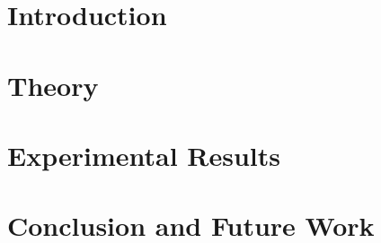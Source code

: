 
\addtolength{\evensidemargin}{-12mm}

\part[Introduction]{Introduction}
\label{part:introduction}



\part[Theory]{Theory}
\label{part:theory}


\part[Experimental Results]{Experimental Results}
\label{part:experiments}



\part[Conclusion and Future Work]{Conclusion and Future Work}
\label{part:conclusion}

